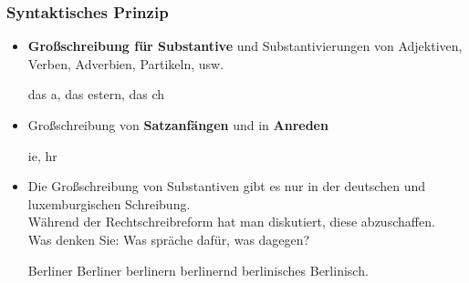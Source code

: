 \begin{frame}
\frametitle{Syntaktisches Prinzip}

\begin{itemize}
	\item \textbf{Großschreibung für Substantive} und Substantivierungen von Adjektiven, Verben, Adverbien, Partikeln, usw. 

	\ea das a, das estern, das ch
	\z 
	
	\item Großschreibung von \textbf{Satzanfängen} und in \textbf{Anreden}
	
	\ea {}ie, hr
	\z 

	
	\item Die Großschreibung von Substantiven gibt es nur in der deutschen und luxemburgischen Schreibung.\\
	Während der Rechtschreibreform hat man diskutiert, diese abzuschaffen.\\
	Was denken Sie: Was spräche dafür, was dagegen?

\pause 
	
	\ea Berliner Berliner berlinern berlinernd berlinisches Berlinisch.
	\z 
\end{itemize}

\end{frame}





